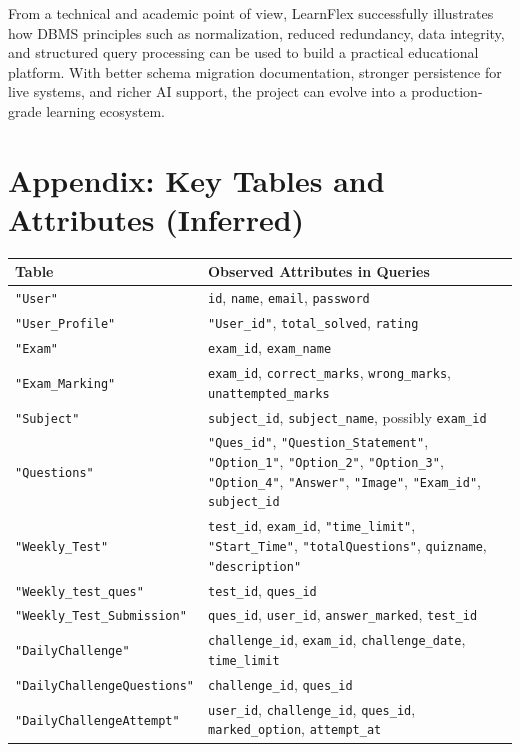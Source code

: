 \documentclass[12pt,a4paper]{article}
\begin{document}
From a technical and academic point of view, LearnFlex successfully illustrates how DBMS principles such as normalization, reduced redundancy, data integrity, and structured query processing can be used to build a practical educational platform. With better schema migration documentation, stronger persistence for live systems, and richer AI support, the project can evolve into a production-grade learning ecosystem.

\section{Appendix: Key Tables and Attributes (Inferred)}
\begin{longtable}{p{4cm}p{9cm}}
\toprule
\textbf{Table} & \textbf{Observed Attributes in Queries} \\
\midrule
\texttt{"User"} & \texttt{id}, \texttt{name}, \texttt{email}, \texttt{password} \\
\texttt{"User\_Profile"} & \texttt{"User\_id"}, \texttt{total\_solved}, \texttt{rating} \\
\texttt{"Exam"} & \texttt{exam\_id}, \texttt{exam\_name} \\
\texttt{"Exam\_Marking"} & \texttt{exam\_id}, \texttt{correct\_marks}, \texttt{wrong\_marks}, \texttt{unattempted\_marks} \\
\texttt{"Subject"} & \texttt{subject\_id}, \texttt{subject\_name}, possibly \texttt{exam\_id} \\
\texttt{"Questions"} & \texttt{"Ques\_id"}, \texttt{"Question\_Statement"}, \texttt{"Option\_1"}, \texttt{"Option\_2"}, \texttt{"Option\_3"}, \texttt{"Option\_4"}, \texttt{"Answer"}, \texttt{"Image"}, \texttt{"Exam\_id"}, \texttt{subject\_id} \\
\texttt{"Weekly\_Test"} & \texttt{test\_id}, \texttt{exam\_id}, \texttt{"time\_limit"}, \texttt{"Start\_Time"}, \texttt{"totalQuestions"}, \texttt{quizname}, \texttt{"description"} \\
\texttt{"Weekly\_test\_ques"} & \texttt{test\_id}, \texttt{ques\_id} \\
\texttt{"Weekly\_Test\_Submission"} & \texttt{ques\_id}, \texttt{user\_id}, \texttt{answer\_marked}, \texttt{test\_id} \\
\texttt{"DailyChallenge"} & \texttt{challenge\_id}, \texttt{exam\_id}, \texttt{challenge\_date}, \texttt{time\_limit} \\
\texttt{"DailyChallengeQuestions"} & \texttt{challenge\_id}, \texttt{ques\_id} \\
\texttt{"DailyChallengeAttempt"} & \texttt{user\_id}, \texttt{challenge\_id}, \texttt{ques\_id}, \texttt{marked\_option}, \texttt{attempt\_at} \\

\end{longtable}
\end{document}

